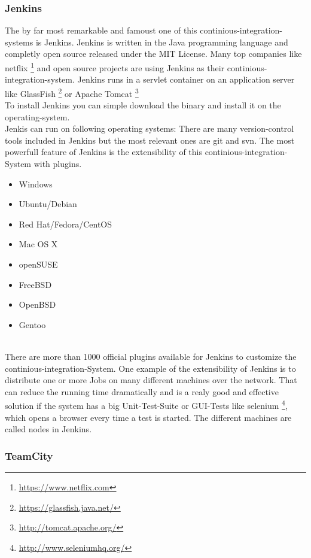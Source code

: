 \subsubsection{Jenkins}
The by far most remarkable and famoust one of this continious-integration-systems is Jenkins. 
Jenkins is written in the Java programming language and completly open source released under the MIT License.
Many top companies like netflix \footnote{\url{https://www.netflix.com}} and open source projects
are using Jenkins as their continious-integration-system.
Jenkins runs in a servlet container on an application server like GlassFish \footnote{\url{https://glassfish.java.net/}}
or Apache Tomcat \footnote{\url{http://tomcat.apache.org/}} \\
To install Jenkins you can simple download the binary and install it on the operating-system.\\
Jenkis can run on following operating systems: 
There are many version-control tools included in Jenkins but the most relevant ones are git and svn.
The most powerfull feature of Jenkins is the extensibility of this continious-integration-System 
with plugins.\\
\begin{itemize} 
        \item Windows
        \item Ubuntu/Debian
        \item Red Hat/Fedora/CentOS
        \item Mac OS X
        \item openSUSE
        \item FreeBSD
        \item OpenBSD
        \item Gentoo
\end{itemize}\\
There are more than 1000 official plugins available for Jenkins to customize the continious-integration-System.  
One example of the extensibility of Jenkins is to distribute one or more  Jobs on many 
different machines over the network. That can reduce the running time dramatically and 
is a realy good and effective solution if the system has a big Unit-Test-Suite or GUI-Tests 
like selenium \footnote{\url{http://www.seleniumhq.org/}}, which opens a browser every time 
a test is started. The different machines are called nodes in Jenkins.

\subsubsection{TeamCity}

